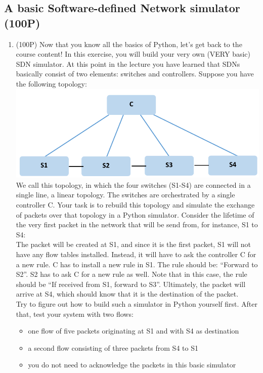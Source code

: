 \documentclass{llncs}
\begin{document}
\subsection{A basic Software-defined Network simulator (100P)}  
\begin{enumerate}
\item (100P) Now that you know all the basics of Python, let’s get back to 
the course content! In this exercise, you will build your very own (VERY 
basic) SDN simulator. At this point in the lecture you have learned that 
SDNs basically consist of two elements: switches and controllers. Suppose 
you have the following topology: \\

\includegraphics[scale=0.53]{images/4-1.png} \\

We call this topology, in which the four switches (S1-S4) are connected in a
single line, a linear topology. The switches are orchestrated by a single 
controller C. Your task is to rebuild this topology and simulate the 
exchange of packets over that topology in a Python simulator. Consider the
lifetime of the very first packet in the network that will be send from, for 
instance, S1 to S4: \\

The packet will be created at S1, and since it is the first packet, S1 will 
not have any flow tables installed. Instead, it will have to ask the 
controller C for a new rule. C has to install a new rule in S1. The rule 
should be: “Forward to S2”. S2 has to ask C for a new rule as  well. Note 
that in this case, the rule should be “If received from S1, forward to S3”.
Ultimately, the packet will arrive at S4, which should know that it is the 
destination of the packet. \\

Try to figure out how to build such a simulator in Python yourself first.
After that, test your system with two flows:

\begin{itemize}
\item one flow of five packets originating at S1 and with S4 as destination
\item a second flow consisting of three packets from S4 to S1
\item you do not need to acknowledge the packets in this basic simulator
\end{itemize}


\end{enumerate}
\end{document}
